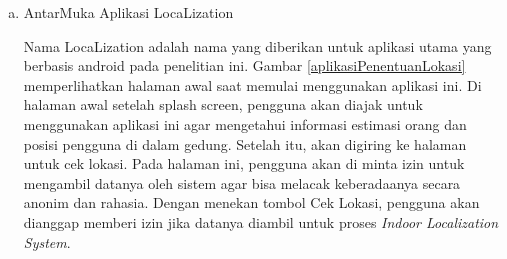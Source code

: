 \begin{enumerate}[a.]
	\item AntarMuka Aplikasi LocaLization

	      \par Nama LocaLization adalah nama yang diberikan untuk aplikasi utama yang berbasis android pada penelitian ini. Gambar \ref{aplikasiPenentuanLokasi} memperlihatkan halaman awal saat memulai menggunakan aplikasi ini. Di halaman awal setelah splash screen, pengguna akan diajak untuk menggunakan aplikasi ini agar mengetahui informasi estimasi orang dan posisi pengguna di dalam gedung. Setelah itu, akan digiring ke halaman untuk cek lokasi. Pada halaman ini, pengguna akan di minta izin untuk mengambil datanya oleh sistem agar bisa melacak keberadaanya secara anonim dan rahasia. Dengan menekan tombol Cek Lokasi, pengguna akan dianggap memberi izin jika datanya diambil untuk proses \textit{Indoor Localization System}.



\end{enumerate}
